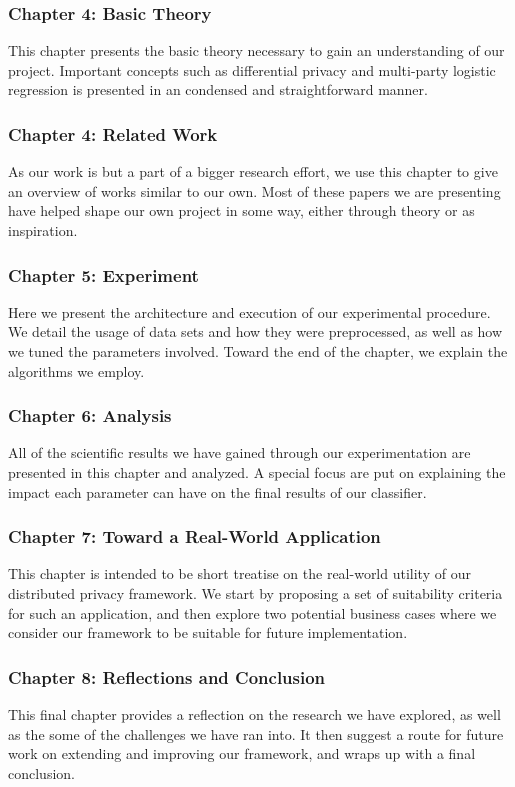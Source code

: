 \subsubsection{Chapter 4: Basic Theory}
This chapter presents the basic theory necessary to gain an understanding of our project. Important concepts such as differential privacy and multi-party logistic regression is presented in an condensed and straightforward manner.

\subsubsection{Chapter 4: Related Work}
As our work is but a part of a bigger research effort, we use this chapter to give an overview of works similar to our own. Most of these papers we are presenting have helped shape our own project in some way, either through theory or as inspiration.

\subsubsection{Chapter 5: Experiment}
Here we present the architecture and execution of our experimental procedure. We detail the usage of data sets and how they were preprocessed, as well as how we tuned the parameters involved. Toward the end of the chapter, we explain the algorithms we employ.

\subsubsection{Chapter 6: Analysis}
All of the scientific results we have gained through our experimentation are presented in this chapter and analyzed. A special focus are put on explaining the impact each parameter can have on the final results of our classifier.

\subsubsection{Chapter 7: Toward a Real-World Application}
This chapter is intended to be short treatise on the real-world utility of our distributed privacy framework. We start by proposing a set of suitability criteria for such an application, and then explore two potential business cases where we consider our framework to be suitable for future implementation.   

\subsubsection{Chapter 8: Reflections and Conclusion}
This final chapter provides a reflection on the research we have explored, as well as the some of the challenges we have ran into. It then suggest a route for future work on extending and improving our framework, and wraps up with a final conclusion.

